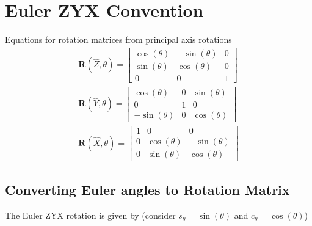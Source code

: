 
\section[A1: Euler ZYX]{Euler ZYX Convention}

Equations for rotation matrices from principal axis rotations
\begin{equation}
    \begin{split}
        \mathbf{R}(\hat{Z}, \theta) = \begin{bmatrix}
            \cos(\theta) & -\sin(\theta) & 0 \\
            \sin(\theta) & \cos(\theta) & 0 \\
            0 & 0 & 1
            \end{bmatrix} \\
        \mathbf{R}(\hat{Y}, \theta) = \begin{bmatrix}
            \cos(\theta) & 0 & \sin(\theta) \\
            0 & 1 & 0 \\
            -\sin(\theta) & 0 & \cos(\theta)
            \end{bmatrix} \\
        \mathbf{R}(\hat{X}, \theta) = \begin{bmatrix}
            1 & 0 & 0 \\
            0 & \cos(\theta) & -\sin(\theta) \\
            0 & \sin(\theta) & \cos(\theta)
            \end{bmatrix}
    \end{split}
\end{equation}

\subsection[A1.1: Euler to SO(3)]{Converting Euler angles to Rotation Matrix}

The Euler ZYX rotation is given by (consider $s_\theta = \sin(\theta)$ and $c_\theta = \cos(\theta)$)


